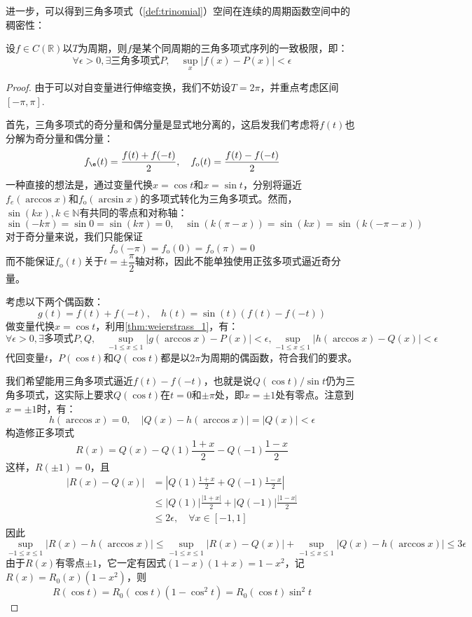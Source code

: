 进一步，可以得到三角多项式（\cref{def:trinomial}）空间在连续的周期函数空间中的稠密性：
\begin{corollary}[魏尔斯特拉斯第二逼近定理]\label{cor:weierstrass_2}
    设$f\in C(\mathbb{R})$以$T$为周期，则$f$是某个同周期的三角多项式序列的一致极限，即：
    \[\forall \epsilon>0,\exists \text{三角多项式}P,\quad \sup_{x}|f(x)-P(x)|<\epsilon\]
\end{corollary}
\begin{proof}
    由于可以对自变量进行伸缩变换，我们不妨设$T=2\pi$，并重点考虑区间$[-\pi,\pi]$.

    首先，三角多项式的奇分量和偶分量是显式地分离的，这启发我们考虑将$f(t)$也分解为奇分量和偶分量：
    $$f_\e(t)=\frac{f(t)+f(-t)}{2},\quad f_\text{o}(t)=\frac{f(t)-f(-t)}{2}$$
    一种直接的想法是，通过变量代换$x=\cos t$和$x=\sin t$，分别将逼近$f_e(\arccos x)$和$f_\text{o}(\arcsin x)$的多项式转化为三角多项式。然而，$\sin(k x),k\in\mathbb{N}$有共同的零点和对称轴：
    $$\sin(-k\pi)=\sin 0=\sin(k\pi)=0,\quad \sin(k(\pi-x))=\sin(kx)=\sin(k(-\pi-x))$$
    对于奇分量来说，我们只能保证
    $$f_\text{o}(-\pi)=f_\text{o}(0)=f_\text{o}(\pi)=0$$
    而不能保证$f_\text{o}(t)$关于$t=\pm \dfrac{\pi}{2}$轴对称，因此不能单独使用正弦多项式逼近奇分量。

    考虑以下两个偶函数：
    $$g(t)=f(t)+f(-t),\quad h(t)=\sin(t)(f(t)-f(-t))$$
    做变量代换$x=\cos t$，利用\cref{thm:weierstrass_1}，有：
    $$\forall \epsilon>0,\exists\text{多项式}P,Q,\quad \sup_{-1\le x\le 1}|g(\arccos x)-P(x)|<\epsilon,\sup_{-1\le x\le 1}|h(\arccos x)-Q(x)|<\epsilon$$
    代回变量$t$，$P(\cos t)$和$Q(\cos t)$都是以$2\pi$为周期的偶函数，符合我们的要求。

    我们希望能用三角多项式逼近$f(t)-f(-t)$，也就是说$Q(\cos t)/\sin t$仍为三角多项式，这实际上要求$Q(\cos t)$在$t=0$和$\pm \pi$处，即$x=\pm 1$处有零点。注意到$x=\pm 1$时，有：
    $$h(\arccos x)=0,\quad |Q(x)-h(\arccos x)|=|Q(x)|<\epsilon$$
    构造修正多项式
    $$R(x)=Q(x)-Q(1)\frac{1+x}{2}-Q(-1)\frac{1-x}{2}$$
    这样，$R(\pm 1)=0$，且
    \begin{align*}
        |R(x)-Q(x)| & =\left|Q(1)\frac{1+x}{2}+Q(-1)\frac{1-x}{2}\right| \\
                    & \le|Q(1)|\frac{|1+x|}{2}+|Q(-1)|\frac{|1-x|}{2}    \\
                    & \le 2\epsilon,\quad \forall x\in[-1,1]
    \end{align*}
    因此
    $$\sup_{-1\le x\le 1}|R(x)-h(\arccos x)|\le\sup_{-1\le x\le 1}|R(x)-Q(x)|+\sup_{-1\le x\le 1}|Q(x)-h(\arccos x)|\le 3\epsilon$$
    由于$R(x)$有零点$\pm 1$，它一定有因式$(1-x)(1+x)=1-x^2$，记$R(x)=R_0(x)(1-x^2)$，则
    $$R(\cos t)=R_0(\cos t)(1-\cos^2 t)=R_0(\cos t)\sin^2 t$$


\end{proof}
